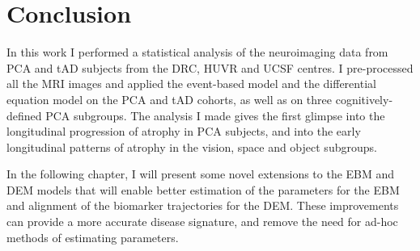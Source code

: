 \section{Conclusion}

In this work I performed a statistical analysis of the neuroimaging data from PCA and tAD subjects from the DRC, HUVR and UCSF centres. I pre-processed all the MRI images and applied the event-based model and the differential equation model on the PCA and tAD cohorts, as well as on three cognitively-defined PCA subgroups. The analysis I made gives the first glimpse into the longitudinal progression of atrophy in PCA subjects, and into the early longitudinal patterns of atrophy in the vision, space and object subgroups.

In the following chapter, I will present some novel extensions to the EBM and DEM models that will enable better estimation of the parameters for the EBM and alignment of the biomarker trajectories for the DEM. These improvements can provide a more accurate disease signature, and remove the need for ad-hoc methods of estimating parameters.





























